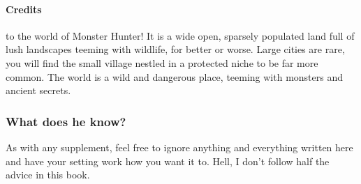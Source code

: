 \frontmatter

\renewcommand{\hbTitle}{Monster Hunter \protect\\ in D\&D 5e}
\renewcommand{\hbSubtitle}{Created by Scaatis, using \texttt{texbrew}\protect\\ \url{https://github.com/Artefact2/texbrew/}}
\renewcommand*{\hbCover}{assets/ext/classic}
\hbMakecover

\renewcommand*{\hbSubcover}{assets/ext/classic2}
\hbMakesubcover


\paragraph*{Credits}

{\footnotesize
\begin{itemize}


\end{itemize}}

\clearpage
\tableofcontents*

\vfill\break
\listoftables*

\mainmatter



 to the world of Monster Hunter! It is a wide open, sparsely populated land full of lush landscapes teeming with wildlife, for better or worse. Large cities are rare, you will find the small village nestled in a protected niche to be far more common. The world is a wild and dangerous place, teeming with monsters and ancient secrets.

\begin{hbNote}[t]
\subsubsection*{What does he know?}
\noindent As with any supplement, feel free to ignore anything and everything written here and have your setting work how you want it to. Hell, I don't follow half the advice in this book.
\end{hbNote}

